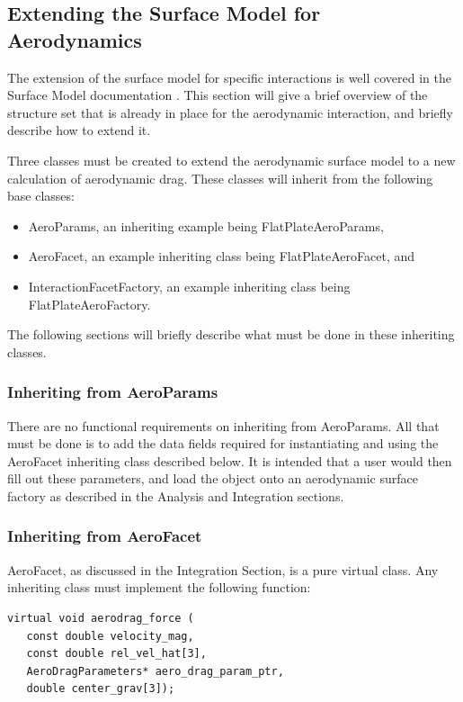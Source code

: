\subsection{Extending the Surface Model for Aerodynamics}

The extension of the surface model for specific interactions is
well covered in the Surface Model documentation
\cite{dynenv:SURFACEMODEL}. This section will give a brief overview
of the structure set that is already in place for the aerodynamic
interaction, and briefly describe how to extend it.

Three classes must be created to extend the aerodynamic surface model
to a new calculation of aerodynamic drag. These classes will inherit
from the following base classes:

\begin{itemize}
\item{AeroParams}, an inheriting example being FlatPlateAeroParams,
\item{AeroFacet}, an example inheriting class being FlatPlateAeroFacet,
and
\item{InteractionFacetFactory}, an example inheriting class being
FlatPlateAeroFactory.
\end{itemize}

The following sections will briefly describe what must be done
in these inheriting classes.

\subsubsection{Inheriting from AeroParams}

There are no functional requirements on inheriting from AeroParams.
All that must be done is to add the data fields required for instantiating
and using the AeroFacet inheriting class described below.
It is intended that a user would then fill out these parameters,
and load the object onto an aerodynamic surface factory as described
in the Analysis and Integration sections.

\subsubsection{Inheriting from AeroFacet}

AeroFacet, as discussed in the Integration Section, is a pure
virtual class. Any inheriting class must implement the following
function:

\begin{verbatim}
virtual void aerodrag_force (
   const double velocity_mag,
   const double rel_vel_hat[3],
   AeroDragParameters* aero_drag_param_ptr,
   double center_grav[3]);
\end{verbatim}

